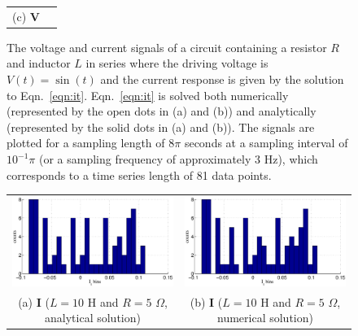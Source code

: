 \documentclass{article}[10pt]
\begin{document}
\begin{figure}[ht]
\begin{center}
\begin{tabular}{cc}
(c) $\mathbf{V}$
\end{tabular}
\end{center}
\caption{The voltage and current signals of a circuit containing a resistor $R$ and inductor $L$ in series where the driving voltage is $V(t)=\sin(t)$ and the current response is given by the solution to Eqn.\ \ref{eqn:it}.  Eqn.\ \ref{eqn:it} is solved both numerically (represented by the open dots in (a) and (b)) and analytically (represented by the solid dots in (a) and (b)).  The signals are plotted for a sampling length of $8\pi$ seconds at a sampling interval of $10^{-1}\pi$ (or a sampling frequency of approximately 3 Hz), which corresponds to a time series length of 81 data points.}
\label{fig:VIplot}
\end{figure}
\begin{figure}[ht]
\begin{center}
\begin{tabular}{cc}
\includegraphics[scale=0.48]{IRCircuitResponseExampleL10R5_Yhist_an.eps} &
\includegraphics[scale=0.48]{IRCircuitResponseExampleL10R5_Yhist_num.eps} \\
(a) $\mathbf{I}$ ($L=10$ H and $R=5$ $\Omega$, analytical solution) & (b) $\mathbf{I}$ ($L=10$ H and $R=5$ $\Omega$, numerical solution)\\

\end{tabular}
\end{center}
\end{figure}
\end{document}
